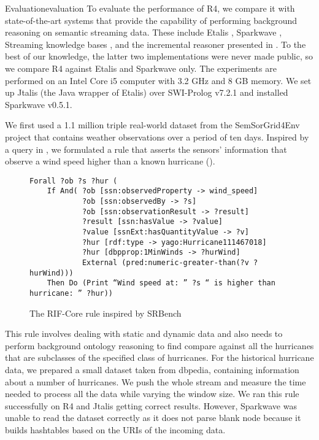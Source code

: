 \begin{nestedsection}{Evaluation}{evaluation}
	To evaluate the performance of R4, we compare it with state-of-the-art systems that provide the capability of performing background reasoning on semantic streaming data.
	These include Etalis \citep{EP-SPARQL}, Sparkwave \citep{sparkwave}, Streaming knowledge bases \citep{walavalkar08streamingkb}, and the incremental reasoner presented in \citep{inc-reasoning-background-knowledge}.
	To the best of our knowledge, the latter two implementations were never made public, so we compare R4 against Etalis and Sparkwave only.
	The experiments are performed on an Intel Core i5 computer with 3.2 GHz and 8 GB memory.
	We set up Jtalis (the Java wrapper of Etalis) over SWI-Prolog v7.2.1 and installed Sparkwave v0.5.1.

	We first used a 1.1 million triple real-world dataset from the SemSorGrid4Env project that contains weather observations over a period of ten days.
	Inspired by a query in \citep{SRBench}, we formulated a rule that asserts the sensors’ information that observe a wind speed higher than a known hurricane ().
	\begin{figure*}
		\centering
		\begin{verbatim}
Forall ?ob ?s ?hur (
    If And( ?ob [ssn:observedProperty -> wind_speed]
            ?ob [ssn:observedBy -> ?s]
            ?ob [ssn:observationResult -> ?result]
            ?result [ssn:hasValue -> ?value]
            ?value [ssnExt:hasQuantityValue -> ?v]
            ?hur [rdf:type -> yago:Hurricane111467018]
            ?hur [dbpprop:1MinWinds -> ?hurWind]
            External (pred:numeric-greater-than(?v ?hurWind)))
    Then Do (Print “Wind speed at: ” ?s “ is higher than hurricane: ” ?hur))
		\end{verbatim}
		\caption{The RIF-Core rule inspired by SRBench}
	\end{figure*}
	This rule involves dealing with static and dynamic data and also needs to perform background ontology reasoning to find compare against all the hurricanes that are subclasses of the specified class of hurricanes.
	For the historical hurricane data, we prepared a small dataset taken from dbpedia, containing information about a number of hurricanes.
	We push the whole stream and measure the time needed to process all the data while varying the window size. We ran this rule successfully on R4 and Jtalis getting correct results.
	However, Sparkwave was unable to read the dataset correctly as it does not parse blank node because it builds hashtables based on the URIs of the incoming data.


\end{nestedsection}
